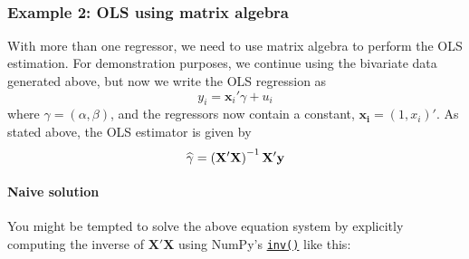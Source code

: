 \documentclass[10pt]{scrartcl}
\begin{document}
    \begin{center}
    \end{center}
    { \hspace*{\fill} \\}
    
    \hypertarget{example-2-ols-using-matrix-algebra}{%
\subsubsection{Example 2: OLS using matrix
algebra}\label{example-2-ols-using-matrix-algebra}}

With more than one regressor, we need to use matrix algebra to perform
the OLS estimation. For demonstration purposes, we continue using the
bivariate data generated above, but now we write the OLS regression as
\[
y_i = \mathbf{x}_i' \gamma + u_i
\] where \(\gamma = (\alpha, \beta)\), and the regressors now contain a
constant, \(\mathbf{x_i} = (1, x_i)'\). As stated above, the OLS
estimator is given by \[
\def\bX{\mathbf{X}}
\widehat{\gamma} = \left(\bX'\bX\right)^{-1}\bX'\mathbf{y}
\]

\hypertarget{naive-solution}{%
\paragraph{Naive solution}\label{naive-solution}}

You might be tempted to solve the above equation system by explicitly
computing the inverse of \(\mathbf{X}'\mathbf{X}\) using NumPy's
\href{https://numpy.org/doc/stable/reference/generated/numpy.linalg.inv.html}{\texttt{inv()}}
like this:
\end{document}
